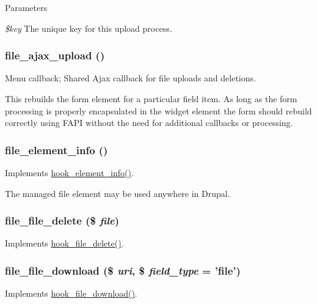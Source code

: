 \begin{DoxyParams}{Parameters}
\item[{\em \$key}]The unique key for this upload process. \end{DoxyParams}
\hypertarget{file_8module_a01240c6ad20b49a60879a93211a4fdbb}{
\subsubsection[{file\_\-ajax\_\-upload}]{\setlength{\rightskip}{0pt plus 5cm}file\_\-ajax\_\-upload ()}}
\label{file_8module_a01240c6ad20b49a60879a93211a4fdbb}
Menu callback; Shared Ajax callback for file uploads and deletions.

This rebuilds the form element for a particular field item. As long as the form processing is properly encapsulated in the widget element the form should rebuild correctly using FAPI without the need for additional callbacks or processing. \hypertarget{file_8module_aa2a3477520eac39499554db31af9b905}{
\subsubsection[{file\_\-element\_\-info}]{\setlength{\rightskip}{0pt plus 5cm}file\_\-element\_\-info ()}}
\label{file_8module_aa2a3477520eac39499554db31af9b905}
Implements \hyperlink{group__hooks_ga3c5182432eddc82f8b7845e66a365d51}{hook\_\-element\_\-info()}.

The managed file element may be used anywhere in Drupal. \hypertarget{file_8module_a1fabb61995abd7c4361037cccf3f6d63}{
\subsubsection[{file\_\-file\_\-delete}]{\setlength{\rightskip}{0pt plus 5cm}file\_\-file\_\-delete (\$ {\em file})}}
\label{file_8module_a1fabb61995abd7c4361037cccf3f6d63}
Implements \hyperlink{group__hooks_gafa88683ad014451b3fbc9ca9bb80afdd}{hook\_\-file\_\-delete()}. \hypertarget{file_8module_a3b90dc2df5781f1fe16027a3b8082948}{
\subsubsection[{file\_\-file\_\-download}]{\setlength{\rightskip}{0pt plus 5cm}file\_\-file\_\-download (\$ {\em uri}, \/  \$ {\em field\_\-type} = {\ttfamily 'file'})}}
\label{file_8module_a3b90dc2df5781f1fe16027a3b8082948}
Implements \hyperlink{group__hooks_gab73f0e658d6630220ba7836ccd011ecc}{hook\_\-file\_\-download()}.

